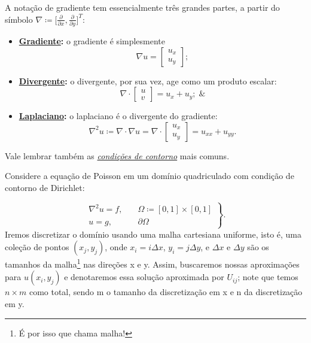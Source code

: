 \documentclass[../differential_methods.tex]{subfiles}
\begin{document}
\begin{tcolorbox}[
		skin=enhanced,
		title=Lembrete!,
		after title={\hfill Notação de Gradiente},
		fonttitle=\bfseries,
		sharp corners=downhill,
		colframe=black,
		colbacktitle=yellow!75!white,
		colback=yellow!30,
		colbacklower=black,
		coltitle=black,
		drop large lifted shadow
	]
	A notação de gradiente tem essencialmente três grandes partes, a partir do símbolo \(\nabla\coloneqq \biggl[\frac{\partial^{}}{\partial x^{}}, \frac{\partial^{}}{\partial y^{}}\biggr]^{T} \):
	\begin{itemize}
		\item \textbf{\underline{Gradiente}:} o gradiente é simplesmente
		      \[
			      \nabla u = \begin{bmatrix}
				      u_{x} \\
				      u_{y}
			      \end{bmatrix};
		      \]
		\item \textbf{\underline{Divergente}:} o divergente, por sua vez, age como um produto escalar:
		      \[
			      \nabla \cdot \begin{bmatrix}
				      u \\
				      v
			      \end{bmatrix} = u_{x}+ u_{y}; \;\&
		      \]
		\item \textbf{\underline{Laplaciano}:} o laplaciano é o divergente do gradiente:
		      \[
			      \nabla^{2}u\coloneqq \nabla \cdot \nabla u = \nabla \cdot \begin{bmatrix}
				      u_{x} \\
				      u_{y}
			      \end{bmatrix} = u_{xx}+u_{yy}.
		      \]
	\end{itemize}
\end{tcolorbox}
Vale lembrar também as \hyperlink{boundary_conditions}{\textit{condições de contorno}} mais comuns.

Considere a equação de Poisson em um domínio quadriculado com condição de contorno de Dirichlet:

\[
	\left.\begin{array}{ll}
		\nabla ^{2}u = f, & \quad \Omega \coloneqq [0,1]\times [0, 1] \\
		u=g,              & \quad \partial \Omega
	\end{array}\right\}.
\]
Iremos discretizar o domínio usando uma malha cartesiana uniforme, isto é, uma coleção de pontos \((x_{j}, y_{j})\), onde \(x_{i}=i\Delta x\), \(y_{i}=j\Delta y\), e \(\Delta x\) e \(\Delta y\) são os tamanhos da malha\footnote{É por isso que chama malha!} nas direções x e y.
Assim, buscaremos nossas aproximações para \(u(x_{i}, y_{j})\) e denotaremos essa solução aproximada por \(U_{ij}\); note que temos \(n \times m\) como total, sendo m o tamanho da discretização em x e n da discretização em y.
\end{document}
